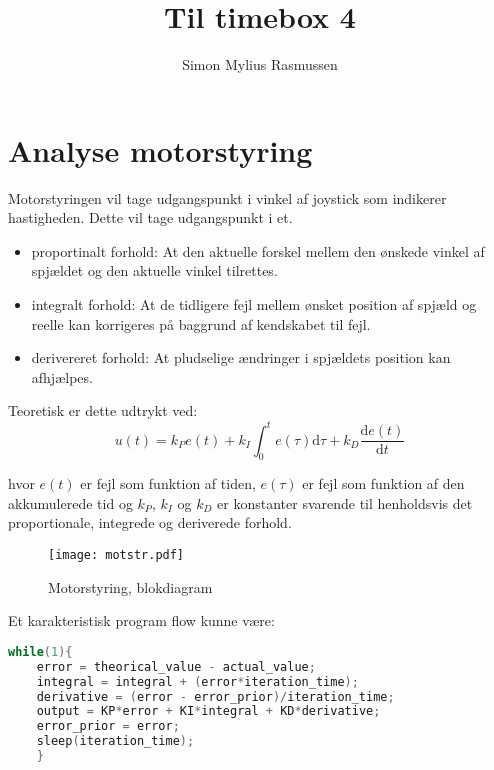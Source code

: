 \documentclass{article}
\author{Simon Mylius Rasmussen}
\title{Til timebox 4}
\begin{document}
\maketitle

\section{Analyse motorstyring}
\label{sec:motorstyring}

Motorstyringen vil tage udgangspunkt i vinkel af joystick som indikerer hastigheden. Dette vil tage udgangspunkt i et.

\begin{itemize}
\item proportinalt forhold: At den aktuelle forskel mellem den ønskede vinkel af spjældet og den aktuelle vinkel tilrettes.
\item integralt forhold: At de tidligere fejl mellem ønsket position af spjæld og reelle kan korrigeres på baggrund af kendskabet til fejl.
\item derivereret forhold: At pludselige ændringer i spjældets position kan afhjælpes.
\end{itemize}

Teoretisk er dette udtrykt ved:
\begin{equation}
  \label{eq:1}
  u(t)=k_Pe(t)+k_I \int_0^t e(\tau)\mathrm{d}\tau + k_D\frac{\mathrm{d}e(t)}{\mathrm{d}t}
\end{equation}

hvor $e(t)$ er fejl som funktion af tiden, $e(\tau)$ er fejl som funktion af den akkumulerede tid og $k_P$, $k_I$ og $k_D$ er konstanter svarende til henholdsvis det proportionale, integrede og deriverede forhold.

\begin{figure}[h]
  \centering
  \texttt{[image: motstr.pdf]}
  \caption{Motorstyring, blokdiagram}
  \label{fig:motorstyr}
\end{figure}

Et karakteristisk program flow kunne være:

\begin{lstlisting}[basicstyle=\ttfamily,language = C]
  while(1){
    error = theorical_value - actual_value;
    integral = integral + (error*iteration_time);
    derivative = (error - error_prior)/iteration_time;
    output = KP*error + KI*integral + KD*derivative;
    error_prior = error;
    sleep(iteration_time);
    }
\end{lstlisting}
\end{document}
